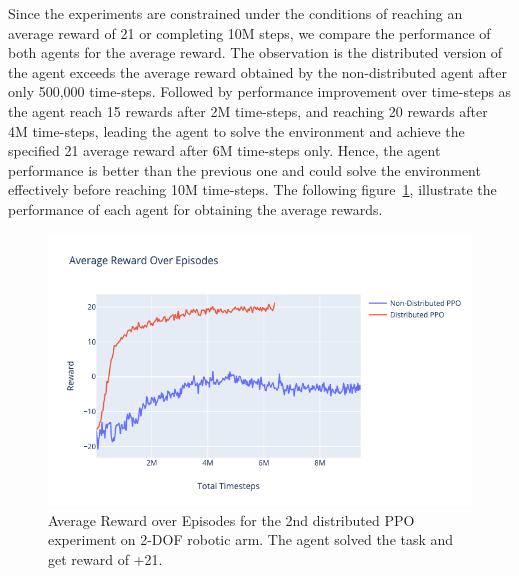 Since the experiments are constrained under the conditions of reaching an average reward of 21 or completing 10M steps, we compare the performance of both agents for the average reward. The observation is the distributed version of the agent exceeds the average reward obtained by the non-distributed agent after only 500,000 time-steps. Followed by performance improvement over time-steps as the agent reach 15 rewards after 2M time-steps, and reaching 20 rewards after 4M time-steps, leading the agent to solve the environment and achieve the specified 21 average reward after 6M time-steps only. Hence, the agent performance is better than the previous one and could solve the environment effectively before reaching 10M time-steps. The following figure~\ref{fig:2nd_exp_avg_eps_reward}, illustrate the performance of each agent for obtaining the average rewards.
\begin{figure}[H] %
		\centering
		\includegraphics[width=1.2\linewidth]{figures/exps/2nd_exp/avg_eps_reward.png}
		\caption{Average Reward over Episodes for the 2nd distributed PPO experiment on 2-DOF robotic arm. The agent solved the task and get reward of +21.}
		\label{fig:2nd_exp_avg_eps_reward}
\end{figure}

